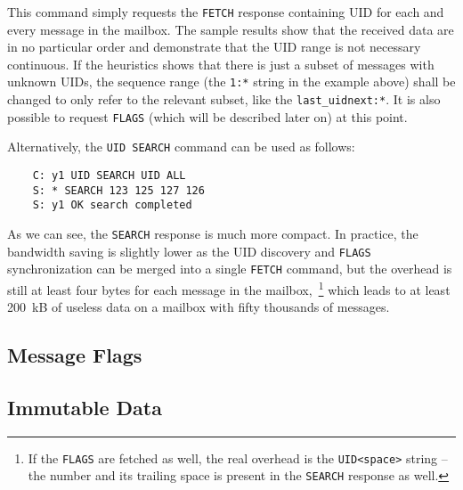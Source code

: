\documentclass[trojita]{subfiles}
\begin{document}
This command simply requests the {\tt FETCH} response containing UID for each and every message in the mailbox.  The
sample results show that the received data are in no particular order and demonstrate that the UID range is not
necessary continuous.  If the heuristics shows that there is just a subset of messages with unknown UIDs,
the sequence range (the {\tt 1:*} string in the example above) shall be changed to only refer to the relevant subset,
like the {\tt last\_uidnext:*}.  It is also possible to request {\tt FLAGS} (which will be described later on) at this
point.

Alternatively, the {\tt UID SEARCH} command can be used as follows:

\begin{verbatim}
    C: y1 UID SEARCH UID ALL
    S: * SEARCH 123 125 127 126
    S: y1 OK search completed
\end{verbatim}

As we can see, the {\tt SEARCH} response is much more compact.  In practice, the bandwidth saving is slightly lower as
the UID discovery and {\tt FLAGS} synchronization can be merged into a single {\tt FETCH} command, but the overhead is
still at least four bytes for each message in the mailbox,~\footnote{If the {\tt FLAGS} are fetched as well, the real
overhead is the {\tt UID<space>} string -- the number and its trailing space is present in the {\tt SEARCH} response as
well.} which leads to at least 200~kB of useless data on a mailbox with fifty thousands of messages.

\subsection{Message Flags}


\subsection{Immutable Data}




\end{document}
